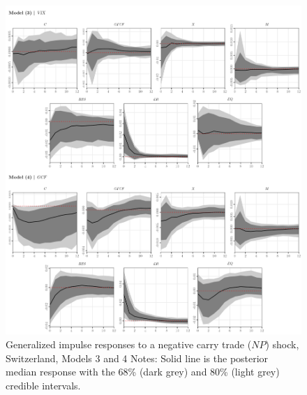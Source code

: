 \documentclass[a4paper, twoside]{templates/ociamthesis}
\begin{document}
\clearpage

\begin{figure}[!ht]

{\centering \includegraphics[width=0.99\columnwidth]{figure/g.MODEL34.NPLOWER.FUND.CH} 

}

\caption[Generalized impulse responses to a negative carry trade ($NP$) shock, Switzerland, Models 3 and 4]{Generalized impulse responses to a negative carry trade ($NP$) shock, Switzerland, Models 3 and 4 \newline \scriptsize Notes: Solid line is the posterior median response with the 68\% (dark grey) and 80\% (light grey) credible intervals.}\label{fig:Figure52}
\end{figure}

\clearpage
\end{document}
